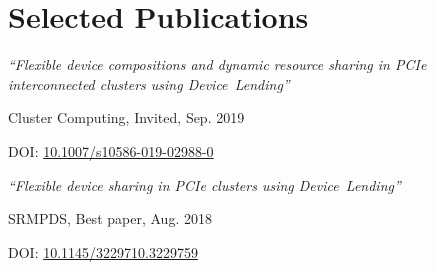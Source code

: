 \section{Selected Publications}

\newcommand{\pub}[5]{
	\parbox[t][][t]{\linewidth}{%
		\parbox{\linewidth}{\small\textit{``#4''}}
		\smallbreak
		\parbox{\linewidth}{\small{#2}, {#1}}
		\parbox{\linewidth}{\small{DOI: {\href{https://doi.org/#3}{#3}}}}
	}
	\bigbreak
	\smallskip
}

\pub{Sep. 2019}{Cluster Computing, Invited}{10.1007/s10586-019-02988-0}{Flexible device compositions and dynamic resource
sharing in PCIe interconnected clusters using Device~Lending}{%
Virtualization; KVM; Peer-to-Peer; Qemu; NTB; Virtual Machines; Cloud Computing;
Composable Infrastructure;
}

\pub{Aug. 2018}{SRMPDS, Best paper}{10.1145/3229710.3229759}{Flexible device sharing in PCIe clusters using
Device~Lending}{%
Paravirtualizaiton; KVM, Virtual Machines;
}

